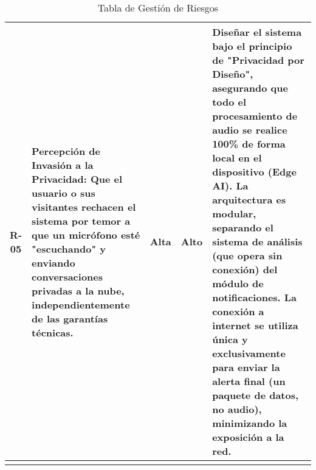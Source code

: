 \begin{longtable}[c]{c p{4cm} c c p{6cm}}
  \addlinespace
  R-05 & Percepción de Invasión a la Privacidad: Que el usuario o sus visitantes rechacen el sistema por temor a que un micrófono esté "escuchando" y enviando conversaciones privadas a la nube, independientemente de las garantías técnicas.                            & Alta         & Alto    & Diseñar el sistema bajo el principio de "Privacidad por Diseño", asegurando que todo el procesamiento de audio se realice 100\% de forma local en el dispositivo (Edge AI). La arquitectura es modular, separando el sistema de análisis (que opera sin conexión) del módulo de notificaciones. La conexión a internet se utiliza única y exclusivamente para enviar la alerta final (un paquete de datos, no audio), minimizando la exposición a la red. \\
  \bottomrule
  \addlinespace

  \caption{Tabla de Gestión de Riesgos}
  \label{tab:risk-management}
\end{longtable}
